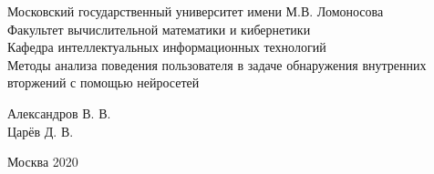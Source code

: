 \begin{center} 

\large Московский государственный университет имени М.В. Ломоносова\\
Факультет вычислительной математики и кибернетики\\
Кафедра интеллектуальных информационных технологий\\[5.5cm] 

\huge Методы анализа поведения пользователя в задаче обнаружения внутренних вторжений с помощью нейросетей \\[0.6cm] %


\end{center} 

\begin{flushright}
Александров В. В. \\
Царёв Д. В. \\
\end{flushright}


\vfill 

\begin{center} 
\large Москва 2020
\end{center} 

\thispagestyle{empty}